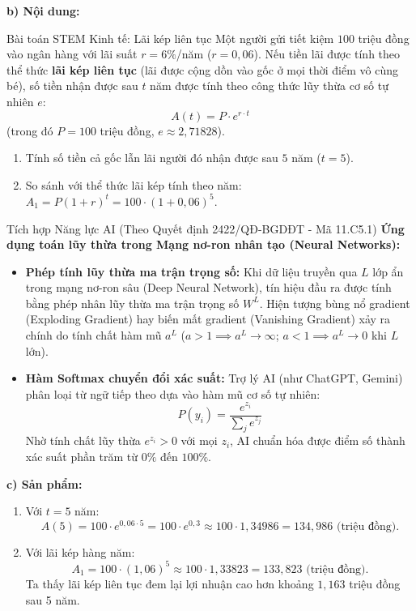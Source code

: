 \documentclass[12pt, a4paper]{article}
\begin{document}
\noindent \textbf{b) Nội dung:}
\begin{stembox}{Bài toán STEM Kinh tế: Lãi kép liên tục}
Một người gửi tiết kiệm $100$ triệu đồng vào ngân hàng với lãi suất $r = 6\%$/năm ($r = 0{,}06$).
Nếu tiền lãi được tính theo thể thức \textbf{lãi kép liên tục} (lãi được cộng dồn vào gốc ở mọi thời điểm vô cùng bé), số tiền nhận được sau $t$ năm được tính theo công thức lũy thừa cơ số tự nhiên $e$:
$$A(t) = P \cdot e^{r \cdot t}$$
(trong đó $P = 100$ triệu đồng, $e \approx 2{,}71828$).
\begin{enumerate}[leftmargin=0.6cm]
    \item Tính số tiền cả gốc lẫn lãi người đó nhận được sau $5$ năm ($t = 5$).
    \item So sánh với thể thức lãi kép tính theo năm: $A_1 = P(1 + r)^t = 100 \cdot (1 + 0{,}06)^5$.
\end{enumerate}
\end{stembox}

\begin{aibox}{Tích hợp Năng lực AI (Theo Quyết định 2422/QĐ-BGDĐT - Mã 11.C5.1)}
\textbf{Ứng dụng toán lũy thừa trong Mạng nơ-ron nhân tạo (Neural Networks):}
\begin{itemize}[leftmargin=0.6cm]
    \item \textbf{Phép tính lũy thừa ma trận trọng số:} Khi dữ liệu truyền qua $L$ lớp ẩn trong mạng nơ-ron sâu (Deep Neural Network), tín hiệu đầu ra được tính bằng phép nhân lũy thừa ma trận trọng số $W^L$. Hiện tượng bùng nổ gradient (Exploding Gradient) hay biến mất gradient (Vanishing Gradient) xảy ra chính do tính chất hàm mũ $a^L$ ($a > 1 \implies a^L \to \infty$; $a < 1 \implies a^L \to 0$ khi $L$ lớn).
    \item \textbf{Hàm Softmax chuyển đổi xác suất:} Trợ lý AI (như ChatGPT, Gemini) phân loại từ ngữ tiếp theo dựa vào hàm mũ cơ số tự nhiên:
    $$P(y_i) = \dfrac{e^{z_i}}{\sum_{j} e^{z_j}}$$
    Nhờ tính chất lũy thừa $e^{z_i} > 0$ với mọi $z_i$, AI chuẩn hóa được điểm số thành xác suất phần trăm từ $0\%$ đến $100\%$.
\end{itemize}
\end{aibox}

\noindent \textbf{c) Sản phẩm:}
\begin{enumerate}[leftmargin=0.6cm]
    \item Với $t = 5$ năm:
    $$A(5) = 100 \cdot e^{0{,}06 \cdot 5} = 100 \cdot e^{0{,}3} \approx 100 \cdot 1{,}34986 = 134{,}986\text{ (triệu đồng)}.$$
    \item Với lãi kép hàng năm:
    $$A_1 = 100 \cdot (1{,}06)^5 \approx 100 \cdot 1{,}33823 = 133{,}823\text{ (triệu đồng)}.$$
    Ta thấy lãi kép liên tục đem lại lợi nhuận cao hơn khoảng $1{,}163$ triệu đồng sau 5 năm.
\end{enumerate}
\end{document}
